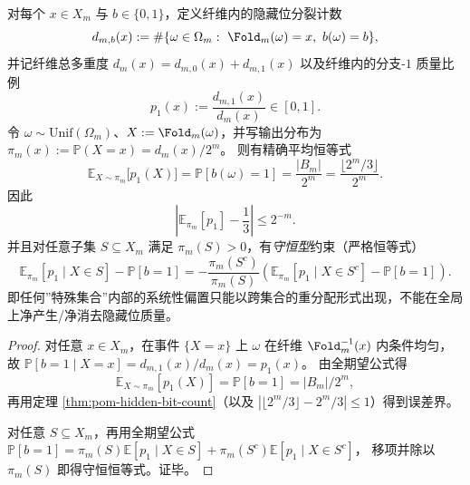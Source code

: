\begin{corollary}[全局分支质量守恒与子集偏置约束]\label{cor:pom-branch-mass-law}
对每个 \(x\in X_m\) 与 \(b\in\{0,1\}\)，定义纤维内的隐藏位分裂计数
\[
d_{m,b}(x):=\#\{\omega\in\Omega_m:\ \Fold_m(\omega)=x,\ b(\omega)=b\},
\]
并记纤维总多重度 \(d_m(x)=d_{m,0}(x)+d_{m,1}(x)\) 以及纤维内的分支-\(1\) 质量比例
\[
p_1(x):=\frac{d_{m,1}(x)}{d_m(x)}\in[0,1].
\]
令 \(\omega\sim\mathrm{Unif}(\Omega_m)\)、\(X:=\Fold_m(\omega)\)，并写输出分布为 \(\pi_m(x):=\mathbb{P}(X=x)=d_m(x)/2^m\)。
则有精确平均恒等式
\[
\boxed{\;
\mathbb{E}_{X\sim\pi_m}\bigl[p_1(X)\bigr]
=\mathbb{P}[b(\omega)=1]
=\frac{|B_m|}{2^m}
=\frac{\lfloor 2^m/3\rfloor}{2^m}. \;}
\]
因此
\[
\left|\mathbb{E}_{\pi_m}[p_1]-\frac13\right|\le 2^{-m}.
\]
并且对任意子集 \(S\subseteq X_m\) 满足 \(\pi_m(S)>0\)，有\emph{守恒型}约束（严格恒等式）
\[
\boxed{\;
\mathbb{E}_{\pi_m}[p_1\mid X\in S]-\mathbb{P}[b=1]
=-\frac{\pi_m(S^c)}{\pi_m(S)}
\left(\mathbb{E}_{\pi_m}[p_1\mid X\in S^c]-\mathbb{P}[b=1]\right). \;}
\]
即任何”特殊集合”内部的系统性偏置只能以跨集合的重分配形式出现，不能在全局上净产生/净消去隐藏位质量。
\end{corollary}
\begin{proof}
对任意 \(x\in X_m\)，在事件 \(\{X=x\}\) 上 \(\omega\) 在纤维 \(\Fold_m^{-1}(x)\) 内条件均匀，故
\(
\mathbb{P}[b=1\mid X=x]=d_{m,1}(x)/d_m(x)=p_1(x)
\)。
由全期望公式得
\[
\mathbb{E}_{X\sim\pi_m}[p_1(X)]=\mathbb{P}[b=1]=|B_m|/2^m,
\]
再用定理 \ref{thm:pom-hidden-bit-count}（以及 \(|\lfloor 2^m/3\rfloor-2^m/3|\le 1\)）得到误差界。
\par
对任意 \(S\subseteq X_m\)，再用全期望公式
\(
\mathbb{P}[b=1]=\pi_m(S)\mathbb{E}[p_1\mid X\in S]+\pi_m(S^c)\mathbb{E}[p_1\mid X\in S^c]
\)，
移项并除以 \(\pi_m(S)\) 即得守恒恒等式。证毕。
\end{proof}

